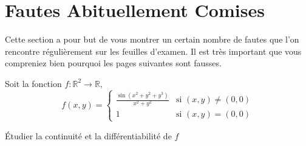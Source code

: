 
\section[FAQ]{Fautes Abituellement Comises}

Cette section a pour but de vous montrer un certain nombre de fautes que l'on rencontre régulièrement sur les feuilles d'examen. Il est très important que vous compreniez bien pourquoi les pages suivantes sont fausses.

\begin{exercice}
Soit la fonction $f : \mathbb{R}^2\to \mathbb{R}$,
\begin{equation}
	f(x,y)=\begin{cases}
		\frac{ \sin(x^2+y^2+y^3) }{ x^2+y^2 }	&	\text{si $(x,y)\neq (0,0)$}\\
			1				&	 \text{si $(x,y)=(0,0)$}
	\end{cases}
\end{equation}

Étudier la continuité et la différentiabilité de $f$
\end{exercice}

